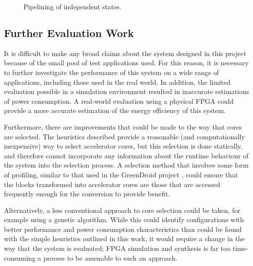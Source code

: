\documentclass{UoYCSproject}
\begin{document}
\begin{figure}[H]
\caption{Pipelining of independent states.}
\label{fig:pipeliningAccelerators}
\end{figure}

\subsection{Further Evaluation Work}

It is difficult to make any broad claims about the system designed in this project because of the small pool of test
applications used. For this reason, it is necessary to further investigate the performance of this system on a wide range of
applications, including those used in the real world. In addition, the limited evaluation possible in a simulation environment
resulted in inaccurate estimations of power consumption. A real-world evaluation using a physical FPGA could provide a more
accurate estimation of the energy efficiency of this system.

Furthermore, there are improvements that could be made to the way that cores are selected. The heuristics described provide
a reasonable (and computationally inexpensive) way to select accelerator cores, but this selection is done statically, and
therefore cannot incorporate any information about the runtime behaviour of the system into the selection process.
A selection method that involves some form of profiling, similar to that used in the GreenDroid project \cite{greendroid},
could ensure that the blocks transformed into accelerator cores are those that are accessed frequently enough
for the conversion to provide benefit.

Alternatively, a less conventional approach to core selection could be taken, for example using a genetic algorithm.
While this could identify configurations with better performance and power consumption characteristics than could be
found with the simple heuristics outlined in this work, it would require a change in the way that the system is evaluated;
FPGA simulation and synthesis is far too time-consuming a process to be amenable to such an approach.
\end{document}
